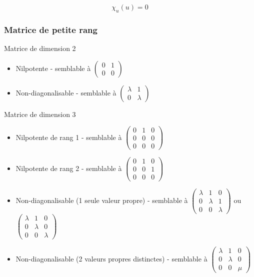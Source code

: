 \documentclass[openany]{book}
\begin{document}
\[ \chi_u(u) = 0 \]

\subsubsection{Matrice de petite rang}

Matrice de dimension 2
\begin{itemize}
    \item Nilpotente - semblable à $\begin{pmatrix}
        0 & 1 \\ 0 & 0
    \end{pmatrix}$
    \item Non-diagonalisable - semblable à $\begin{pmatrix}
        \lambda & 1 \\ 0 & \lambda
    \end{pmatrix}$
\end{itemize}

Matrice de dimension 3
\begin{itemize}
    \item Nilpotente de rang 1 - semblable à $\begin{pmatrix}
        0 & 1 & 0 \\ 0 & 0 & 0 \\ 0 & 0 & 0
    \end{pmatrix}$
    \item Nilpotente de rang 2 - semblable à $\begin{pmatrix}
        0 & 1 & 0 \\ 0 & 0 & 1 \\ 0 & 0 & 0
    \end{pmatrix}$
    \item Non-diagonalisable (1 seule valeur propre) - semblable à $\begin{pmatrix}
        \lambda & 1 & 0 \\ 0 & \lambda & 1 \\ 0 & 0 & \lambda
    \end{pmatrix}$ ou $\begin{pmatrix}
        \lambda & 1 & 0 \\ 0 & \lambda & 0 \\ 0 & 0 & \lambda
    \end{pmatrix}$
    \item Non-diagonalisable (2 valeurs propres distinctes) - semblable à $\begin{pmatrix}
        \lambda & 1 & 0 \\ 0 & \lambda & 0 \\ 0 & 0 & \mu
    \end{pmatrix}$
\end{itemize}
\end{document}
